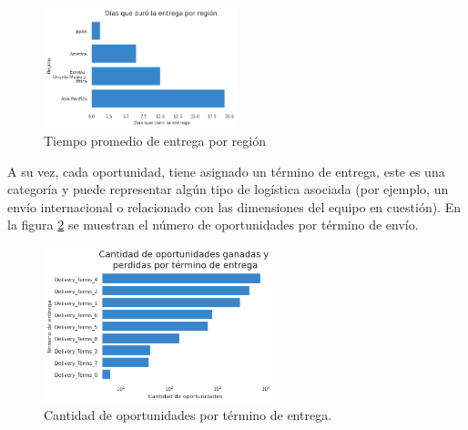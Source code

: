 \documentclass[titlepage,a4paper]{article}
\begin{document}
\begin{figure}[H]
\centering
\includegraphics[width=0.5\textwidth]{images/bp_tiempo_promedio_tiempo_entrega_por_region.png}
\cprotect\caption{\label{fig:promedio_tiempo_entrega_region}Tiempo promedio de entrega por región}
\end{figure}

A su vez, cada oportunidad, tiene asignado un término de entrega, este es una categoría y puede representar algún tipo de logística asociada (por ejemplo, un envío internacional o relacionado con las dimensiones del equipo en cuestión). En la figura \ref{fig:bp_cantidad_opp_por_termino_de_entrega} se muestran el número de oportunidades por término de envío.
\begin{figure}[H]
\centering
\includegraphics[width=0.6\textwidth]{images/bp_cantidad_opp_por_termino_de_entrega.png}
\cprotect\caption{\label{fig:bp_cantidad_opp_por_termino_de_entrega} Cantidad de oportunidades por término de entrega. }
\end{figure}
\end{document}
